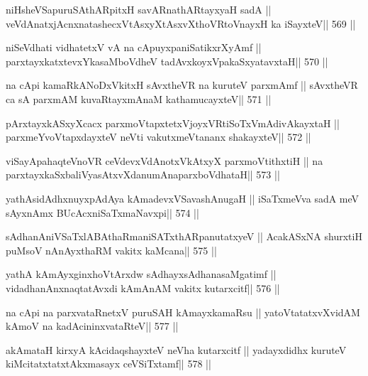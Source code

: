 \begin{shl}
niHsheVSapuruSAthARpitxH savARnathARtayxyaH sadA ||
veVdAnatxjAcnxnatashecxVtAsxyXtAsxvXthoVR\s toV\s nayxH ka iSayxteV\hfill || 569 ||
\end{shl}

\begin{shl}
niSeVdhati vidhatetxV vA na cApuyxpaniSatikxrXyAmf ||
parxtayxkatxtevxYkasaMboVdheV tadAvxkoyxVpakaSxyatavxtaH\hfill || 570 ||
\end{shl}

\begin{shl}
na cApi kamaRkANoDxVkitxH sAvxtheVR na kuruteV parxmAmf ||
sAvxtheVR ca sA parxmAM kuvaRtayxmAnaM kathamucayxteV\hfill || 571 ||
\end{shl}

\begin{shl}
pArxtayxkASxyXcacx parxmoVtapxtetxVjoyxVRtiSoTxVmAdivAkayxtaH ||
parxmeYvoVtapxdayxteV neVti vakutxmeVtananx shakayxteV\hfill || 572 ||
\end{shl}

\begin{shl}
viSayApahaqteVnoVR ceVdevxVdAnotxVkAtxyX parxmoVtithxtiH ||
na parxtayxkaSxbaliVyasAtxvXdanumAnaparxboVdhataH\hfill || 573 ||
\end{shl}

\begin{shl}
yathAsidAdhxnuyxpAdAya kAmadevxVSavashAnugaH ||
iSaTxmeVva sadA meV sAyxnAmx BUcAcxniSaTxmaNavxpi\hfill || 574 ||
\end{shl}

\begin{shl}
sAdhanAniVSaTxlABAthaRmaniSATxthARpanutatxyeV ||
AcakASxNA shurxtiH puMsoV nAnAyxthaRM vakitx kaMcana\hfill || 575 ||
\end{shl}

\begin{shl}
yathA kAmAyxginxhoVtArxdw sAdhayxsAdhanasaMgatimf ||
vidadhanAnxnaqtatAvxdi kAmAnAM vakitx kutarxcitf\hfill || 576 ||
\end{shl}

\begin{shl}
na cApi na parxvataRnetxV puruSAH kAmayxkamaRsu ||
yatoV\s tatatxvXvidAM kAmoV na kadAcininxvataRteV\hfill || 577 ||
\end{shl}

\begin{shl}
akAmataH kirxyA kAcidaqshayxteV neVha kutarxcitf ||
yadayxdidhx kuruteV kiMcitatxtatxtAkxmasayx ceVSiTxtamf\hfill || 578 ||
\end{shl}

